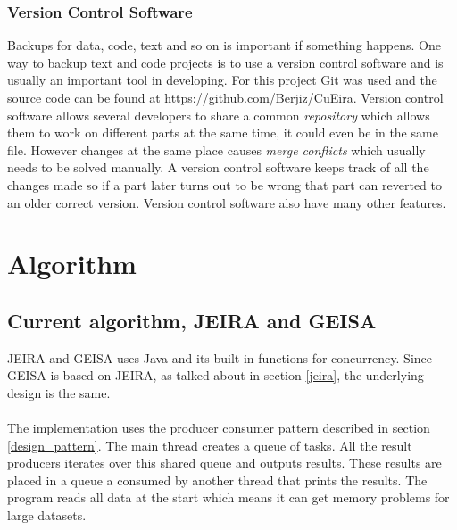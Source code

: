 \documentclass[10pt,a4paper]{report}
\begin{document}
\newpage
\subsection{Version Control Software}
Backups for data, code, text and so on is important if something happens. One way to backup text and code projects is to use a version control software and is usually an important tool in developing\cite{git_book}. For this project Git was used and the source code can be found at \url{https://github.com/Berjiz/CuEira}. Version control software allows several developers to share a common \emph{repository} which allows them to work on different parts at the same time, it could even be in the same file\cite{git_book}. However changes at the same place causes \emph{merge conflicts} which usually needs to be solved manually\cite{git_book}. A version control software keeps track of all the changes made so if a part later turns out to be wrong that part can reverted to an older correct version\cite{git_book}. Version control software also have many other features\cite{git_book}.

\clearpage
\chapter{Algorithm}







\section{Current algorithm, JEIRA and GEISA}
JEIRA and GEISA uses Java and its built-in functions for concurrency. Since GEISA is based on JEIRA, as talked about in section \ref{jeira}, the underlying design is the same.\\
\\
The implementation uses the producer consumer pattern described in section \ref{design_pattern}. The main thread creates a queue of tasks. All the result producers iterates over this shared queue and outputs results. These results are placed in a queue a consumed by another thread that prints the results. The program reads all data at the start which means it can get memory problems for large datasets.
\end{document}
